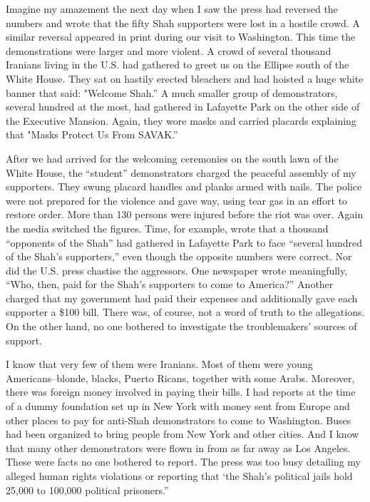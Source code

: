 Imagine my amazement the next day when I saw the press had reversed the numbers and wrote that the fifty Shah supporters were lost in a hostile crowd. A similar reversal appeared in print during our visit to Washington. This time the demonstrations were larger and more violent. A crowd of several thousand Iranians living in the U.S. had gathered to greet us on the Ellipse south of the White House. They sat on hastily erected bleachers and had hoisted a huge white banner that said: "Welcome Shah.” A much smaller group of demonstrators, several hundred at the most, had gathered in Lafayette Park on the other side of the Executive Mansion. Again, they wore masks and carried placards explaining that "Masks Protect Us From SAVAK.” 

After we had arrived for the welcoming ceremonies on the south lawn of the White House, the “student” demonstrators charged the peaceful assembly of my supporters. They swung placard handles and planks armed with nails. The police were not prepared for the violence and gave way, using tear gas in an effort to restore order. More than 130 persons were injured before the riot was over. Again the media switched the figures. Time, for example, wrote that a thousand “opponents of the Shah” had gathered in Lafayette Park to face “several hundred of the Shah's supporters,” even though the opposite numbers were correct. Nor did the U.S. press chastise the aggressors. One newspaper wrote meaningfully, “Who, then, paid for the Shah's supporters to come to America?” Another charged that my government had paid their expenses and additionally gave each supporter a \$100 bill. There was, of course, not a word of truth to the allegations. On the other hand, no one bothered to investigate the troublemakers’ sources of support. 

I know that very few of them were Iranians. Most of them were young Americans--blonde, blacks, Puerto Ricans, together with some Arabs. Moreover, there was foreign money involved in paying their bills. I had reports at the time of a dummy foundation set up in New York with money sent from Europe and other places to pay for anti-Shah demonstrators to come to Washington. Buses had been organized to bring people from New York and other cities. And I know that many other demonstrators were flown in from as far away as Los Angeles. These were facts no one bothered to report. The press was too busy detailing my alleged human rights violations or reporting that ‘the Shah's political jails hold 25,000 to 100,000 political prisoners.” 


